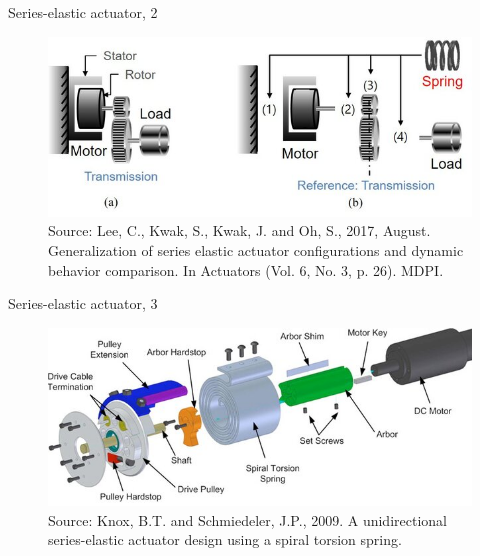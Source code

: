 \documentclass{beamer}
\begin{document}
\begin{frame}{Series-elastic actuator, 2}
	\begin{flushleft}
		
		\begin{figure}
			\centering
			\includegraphics[width=0.95\linewidth]{SEA1}
			\caption{ Source: Lee, C., Kwak, S., Kwak, J. and Oh, S., 2017, August. Generalization of series elastic actuator configurations and dynamic behavior comparison. In Actuators (Vol. 6, No. 3, p. 26). MDPI. }
			\label{fig:sea1}
		\end{figure}
		
		
	\end{flushleft}
\end{frame}


\begin{frame}{Series-elastic actuator, 3}
	\begin{flushleft}
		
\begin{figure}
	\centering
	\includegraphics[width=0.95\linewidth]{SEA2}
	\caption{Source: Knox, B.T. and Schmiedeler, J.P., 2009. A unidirectional series-elastic actuator design using a spiral torsion spring.}
	\label{fig:sea2}
\end{figure}

		
	\end{flushleft}
\end{frame}
\end{document}
